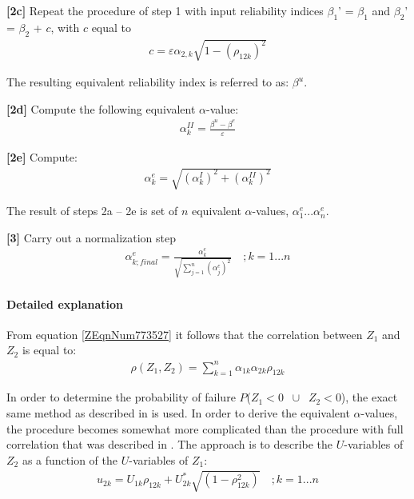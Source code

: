 \textbf{[2c]} Repeat the procedure of step 1 with input reliability indices $\beta_1$' = $\beta_1$ and $\beta_2$' = $\beta_2$ + $c$, with $c$ equal to 
\begin{align}
c=\varepsilon \alpha _{2,k} \sqrt{1-\left(\rho _{12k} \right)^{2} } \label{0.105)} 
\end{align}

The resulting equivalent reliability index is referred to as: $\beta^u$.

\textbf{[2d]} Compute the following equivalent $\alpha$-value:
\begin{align}
\alpha _{k}^{II} =\frac{\beta ^{u} -\beta ^{e} }{\varepsilon } \label{0.106)} 
\end{align}

\textbf{[2e]} Compute:
\begin{align}
\alpha _{k}^{e} =\sqrt{\left(\alpha _{k}^{I} \right)^{2} +\left(\alpha _{k}^{II} \right)^{2} } \label{0.107)} 
\end{align}

The result of steps 2a -- 2e is set of $n$ equivalent $\alpha $-values, $\alpha_1^e$...$\alpha_n^e$.

\textbf{[3]} Carry out a normalization step
\begin{align}
\alpha _{k;final}^{e} =\frac{\alpha _{k}^{e} }{\sqrt{\sum _{j=1}^{n}\left(\alpha _{j}^{e} \right)^{2}  } } \quad ;k=1...n\label{ZEqnNum410058} 
\end{align}

\paragraph*{Detailed explanation}

From equation \eqref{ZEqnNum773527} it follows that the correlation between $Z_1$ and $Z_2$ is equal to: 
\begin{align}
\rho \left(Z_{1} ,Z_{2} \right)=\sum _{k=1}^{n}\alpha _{1k} \alpha _{2k} \rho _{12k}  \label{ZEqnNum590491} 
\end{align}

In order to determine the probability of failure $P$($Z_1<0$ $~\cup~$ $Z_2$$<$0), the exact same method as described in  is used. In order to derive the equivalent $\alpha$-values, the procedure becomes somewhat more complicated than the procedure with full correlation that was described in . The approach is to describe the $U$-variables of $Z_2$ as a function of the $U$-variables of $Z_1$:
\begin{align}
u_{2k} =U_{1k} \rho _{12k} +U_{2k}^{*} \sqrt{(1-\rho _{12k}^{2} )} \quad ;k=1...n\label{ZEqnNum645187} 
\end{align}

